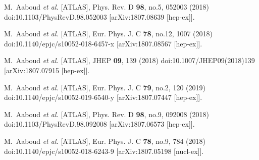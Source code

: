 \begin{thebibliography}{9}
M.~Aaboud \textit{et al.} [ATLAS],
Phys. Rev. D \textbf{98}, no.5, 052003 (2018)
doi:10.1103/PhysRevD.98.052003
[arXiv:1807.08639 [hep-ex]].

M.~Aaboud \textit{et al.} [ATLAS],
Eur. Phys. J. C \textbf{78}, no.12, 1007 (2018)
doi:10.1140/epjc/s10052-018-6457-x
[arXiv:1807.08567 [hep-ex]].

M.~Aaboud \textit{et al.} [ATLAS],
JHEP \textbf{09}, 139 (2018)
doi:10.1007/JHEP09(2018)139
[arXiv:1807.07915 [hep-ex]].

M.~Aaboud \textit{et al.} [ATLAS],
Eur. Phys. J. C \textbf{79}, no.2, 120 (2019)
doi:10.1140/epjc/s10052-019-6540-y
[arXiv:1807.07447 [hep-ex]].

M.~Aaboud \textit{et al.} [ATLAS],
Phys. Rev. D \textbf{98}, no.9, 092008 (2018)
doi:10.1103/PhysRevD.98.092008
[arXiv:1807.06573 [hep-ex]].

M.~Aaboud \textit{et al.} [ATLAS],
Eur. Phys. J. C \textbf{78}, no.9, 784 (2018)
doi:10.1140/epjc/s10052-018-6243-9
[arXiv:1807.05198 [nucl-ex]].


\end{thebibliography}
